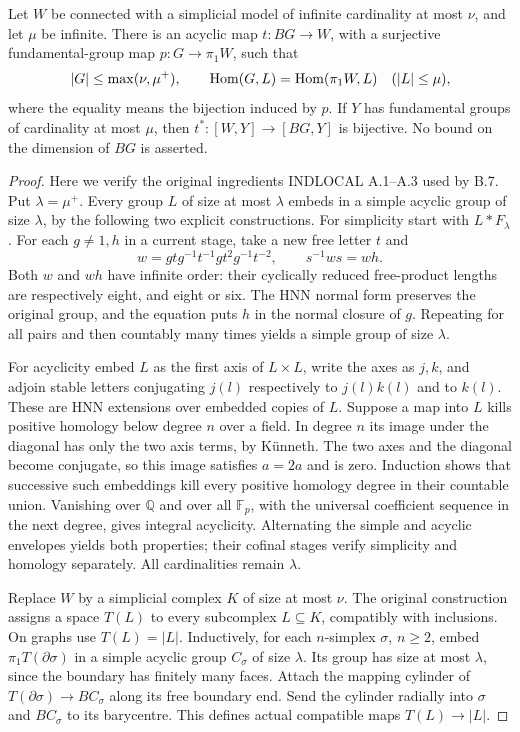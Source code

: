 \begin{lemma}
\label{CD:acycliccomparison}
Let $W$ be connected with a simplicial model of infinite cardinality at
most $\nu$, and let $\mu$ be infinite.  There is an acyclic map
$t:BG\to W$, with a surjective fundamental-group map $p:G\to\pi_1W$,
such that
\[
 |G|\le\max(\nu,\mu^+),\qquad
 \operatorname{Hom}(G,L)=\operatorname{Hom}(\pi_1W,L)\quad(|L|\le\mu),
\]
where the equality means the bijection induced by $p$.
If $Y$ has fundamental groups of cardinality at most $\mu$, then
$t^*:[W,Y]\to[BG,Y]$ is bijective.
No bound on the dimension of $BG$ is asserted.
\end{lemma}
\begin{proof}
Here we verify the original ingredients INDLOCAL A.1--A.3 used by
B.7.  Put $\lambda=\mu^+$.  Every group $L$ of size at most $\lambda$
embeds in a simple acyclic group of size $\lambda$, by the following
two explicit constructions.  For simplicity start with $L*F_\lambda$.
For each $g\ne1,h$ in a current stage, take a new free letter $t$ and
\[
 w=gtg^{-1}t^{-1}gt^2g^{-1}t^{-2},\qquad s^{-1}ws=wh.
\]
Both $w$ and $wh$ have infinite order: their cyclically reduced
free-product lengths are respectively eight, and eight or six.
The HNN normal form preserves the original group, and the equation
puts $h$ in the normal closure of $g$.  Repeating for all pairs and
then countably many times yields a simple group of size $\lambda$.

For acyclicity embed $L$ as the first axis of $L\times L$, write the
axes as $j,k$, and adjoin stable letters conjugating $j(l)$ respectively
to $j(l)k(l)$ and to $k(l)$.  These are HNN extensions over embedded
copies of $L$.  Suppose a map into $L$ kills positive homology below
degree $n$ over a field.  In degree $n$ its image under the diagonal
has only the two axis terms, by K\"unneth.  The two axes and the
diagonal become conjugate, so this image satisfies $a=2a$ and is zero.
Induction shows that successive such embeddings kill every positive
homology degree in their countable union.  Vanishing over $\mathbb Q$
and over all $\mathbb F_p$, with the universal coefficient sequence
in the next degree, gives integral acyclicity.  Alternating the simple
and acyclic envelopes yields both properties; their cofinal stages
verify simplicity and homology separately.  All cardinalities remain
$\lambda$.

Replace $W$ by a simplicial complex $K$ of size at most $\nu$.
The original construction assigns a space $T(L)$ to every subcomplex
$L\subseteq K$, compatibly with inclusions.  On graphs use $T(L)=|L|$.
Inductively, for each $n$-simplex $\sigma$, $n\ge2$, embed
$\pi_1T(\partial\sigma)$ in a simple acyclic group $C_\sigma$ of
size $\lambda$.  Its group has size at most $\lambda$, since the
boundary has finitely many faces.  Attach the mapping cylinder of
$T(\partial\sigma)\to BC_\sigma$ along its free boundary end.
Send the cylinder radially into $\sigma$ and $BC_\sigma$ to its
barycentre.  This defines actual compatible maps $T(L)\to|L|$.


\end{proof}
